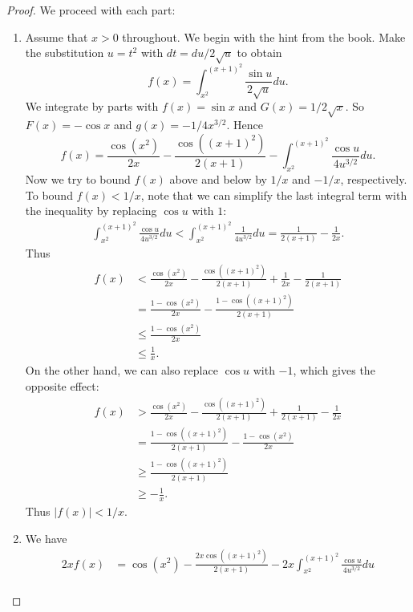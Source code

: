 \documentclass[12pt]{article}
\theoremstyle{remark}
\theoremstyle{named}
\newcommand{\abs}[1]{|#1|}
\begin{document}
\begin{proof}
    We proceed with each part:
    \begin{enumerate}
        \item Assume that \(x > 0\) throughout. We begin with the hint from the book. Make the substitution \(u = t^2\) with \(dt = du / 2\sqrt u\) to obtain
        \[f(x) = \int_{x^2}^{(x + 1)^2} \frac{\sin u}{2\sqrt{u}}du.\]
        We integrate by parts with \(f(x) = \sin x\) and \(G(x) = 1 / 2\sqrt x\). So \(F(x) = -\cos x\) and \(g(x) = -1 / 4 x^{3/2}\). Hence 
        \[f(x) = \frac{\cos(x^2)}{2x} - \frac{\cos((x + 1)^2)}{2(x + 1)} - \int_{x^2}^{(x + 1)^2}\frac{\cos u}{4 u^{3/2}}du.\]
        Now we try to bound \(f(x)\) above and below by \(1/x\) and \(-1/x\), respectively. To bound \(f(x) < 1/x\), note that we can simplify the last integral term with the inequality by replacing \(\cos u\) with \(1\):
        \begin{align*}
            \int_{x^2}^{(x + 1)^2}\frac{\cos u}{4 u^{3/2}}du < \int_{x^2}^{(x + 1)^2}\frac{1}{4 u^{3/2}}du = \frac{1}{2(x + 1)} - \frac{1}{2x}.
        \end{align*}
        Thus 
        \begin{align*}
            f(x) &< \frac{\cos(x^2)}{2x} - \frac{\cos((x + 1)^2)}{2(x + 1)} + \frac{1}{2x} - \frac{1}{2(x + 1)} \\
            &= \frac{1 - \cos(x^2)}{2x} - \frac{1 - \cos((x + 1)^2)}{2(x + 1)} \\
            &\le \frac{1 - \cos(x^2)}{2x} \\
            &\le \frac{1}{x}.
        \end{align*}
        On the other hand, we can also replace \(\cos u\) with \(-1\), which gives the opposite effect:
        \begin{align*}
            f(x) &> \frac{\cos(x^2)}{2x} - \frac{\cos((x + 1)^2)}{2(x + 1)} + \frac{1}{2(x + 1)} - \frac{1}{2x} \\
            &= \frac{1 - \cos((x + 1)^2)}{2(x + 1)} - \frac{1 - \cos(x^2)}{2x} \\
            &\ge \frac{1 - \cos((x + 1)^2)}{2(x + 1)} \\
            &\ge -\frac{1}{x}.
        \end{align*}
        Thus \(\abs{f(x)} < 1 / x\). 
        \item We have 
        \begin{align*}
            2xf(x) &= \cos(x^2) - \frac{2x\cos((x + 1)^2)}{2(x + 1)} - 2x\int_{x^2}^{(x + 1)^2}\frac{\cos u}{4 u^{3/2}}du \\

\end{align*}
\end{enumerate}
\end{proof}
\end{document}
